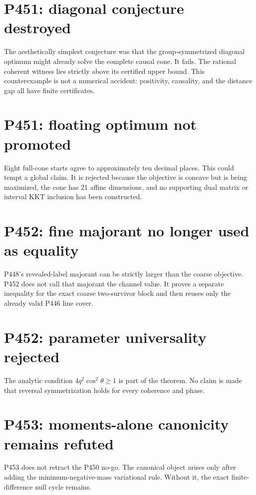 \documentclass[11pt,a4paper,openany]{report}
\begin{document}
\section{P451: diagonal conjecture destroyed}

The aesthetically simplest conjecture was that the group-symmetrized diagonal optimum might already solve the complete causal cone. It fails. The rational coherent witness lies strictly above its certified upper bound. This counterexample is not a numerical accident: positivity, causality, and the distance gap all have finite certificates.

\section{P451: floating optimum not promoted}

Eight full-cone starts agree to approximately ten decimal places. This could tempt a global claim. It is rejected because the objective is concave but is being maximized, the cone has 21 affine dimensions, and no supporting dual matrix or interval KKT inclusion has been constructed.

\section{P452: fine majorant no longer used as equality}

P448's revealed-label majorant can be strictly larger than the coarse objective. P452 does not call that majorant the channel value. It proves a separate inequality for the exact coarse two-survivor block and then reuses only the already valid P446 line cover.

\section{P452: parameter universality rejected}

The analytic condition \(4q^2\cos^2\theta\ge1\) is part of the theorem. No claim is made that reversal symmetrization holds for every coherence and phase.

\section{P453: moments-alone canonicity remains refuted}

P453 does not retract the P450 no-go. The canonical object arises only after adding the minimum-negative-mass variational rule. Without it, the exact finite-difference null cycle remains.
\end{document}
